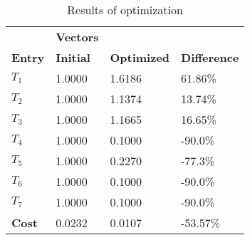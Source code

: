 \begin{table}[H]
\centering
\begin{tabular}{llll}
\textbf{}      & \cellcolor[HTML]{EFEFEF}\textbf{Vectors} & \textbf{} & \textbf{}         \\
\rowcolor[HTML]{EFEFEF} 
\textbf{Entry} & \textbf{Initial} & \textbf{Optimized} & \textbf{Difference} \\
$T_1$ & 1.0000 & 1.6186 & 61.86\% \\ 
$T_2$ & 1.0000 & 1.1374 & 13.74\% \\ 
$T_3$ & 1.0000 & 1.1665 & 16.65\% \\ 
$T_4$ & 1.0000 & 0.1000 & -90.0\% \\ 
$T_5$ & 1.0000 & 0.2270 & -77.3\% \\ 
$T_6$ & 1.0000 & 0.1000 & -90.0\% \\ 
$T_7$ & 1.0000 & 0.1000 & -90.0\% \\ 
\rowcolor[HTML]{EFEFEF} 
\textbf{Cost}  & 0.0232 & 0.0107 & -53.57\% \\ 
\end{tabular}
\caption{Results of optimization}
\label{tab:OptimizationAnalysis}
\end{table}